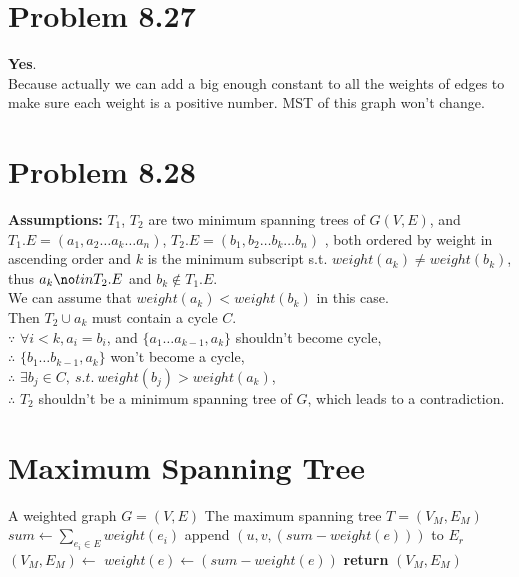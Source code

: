 \documentclass[a4paper]{article}
\begin{document}
\begin{spacing}{1.3}
\section*{Problem 8.27}
\textbf{Yes}.
\\Because actually we can add a big enough constant to all the weights of edges to make sure each weight is a positive number. MST of this graph won't change.

\section*{Problem 8.28}
\textbf{Assumptions:} $T_1$, $T_2$ are two minimum spanning trees of $G(V,E)$, 
and $T_1.E=(a_1,a_2\ldots a_k\ldots a_n)$, $T_2.E=(b_1,b_2\ldots b_k\ldots b_n)$
, both ordered by weight in ascending order and $k$ is the minimum subscript s.t. 
$weight(a_k)\neq weight(b_k)$, thus $a_k \no tin T_2.E$ and $b_k \notin T_1.E$.
\\We can assume that $weight(a_k) < weight(b_k)$ in this case.
\\Then $T_2\cup a_k$ must contain a cycle $C$.
\\$\because$ $\forall i<k,a_i=b_i$, and $\{a_1\ldots a_{k-1},a_{k}\}$ shouldn't become cycle,
\\$\therefore$ $\{b_1\ldots b_{k-1},a_{k}\}$ won't become a cycle,
\\$\therefore$ $\exists b_j\in C,\ s.t.\ weight(b_j)>weight(a_k)$,
\\$\therefore$ $T_2$ shouldn't be a minimum spanning tree of $G$, which leads to a contradiction.

\section*{Maximum Spanning Tree}
\begin{algorithmic}[1]
\Require A weighted graph $G=(V,E)$
\Ensure The maximum spanning tree $T=(V_M,E_M)$
\State $sum\gets \sum\limits_{e_i\in E}weight(e_i)$
\State append $(u,v,(sum-weight(e)))$ to $E_r$ 
\EndFor
\State $(V_M,E_M)\gets$ 
\State $weight(e)\gets (sum-weight(e))$
\EndFor
\State \textbf{return} $(V_M,E_M)$
\end{algorithmic}

\end{spacing}
\end{document}
